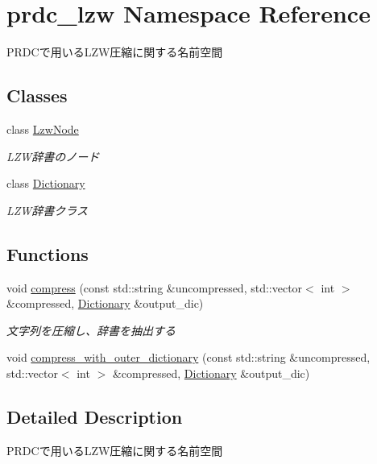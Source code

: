 \hypertarget{namespaceprdc__lzw}{\section{prdc\-\_\-lzw Namespace Reference}
\label{namespaceprdc__lzw}
}


P\-R\-D\-Cで用いる\-L\-Z\-W圧縮に関する名前空間  


\subsection*{Classes}
\begin{DoxyCompactItemize}
\item 
class \hyperlink{classprdc__lzw_1_1LzwNode}{Lzw\-Node}
\begin{DoxyCompactList}\small\item\em L\-Z\-W辞書のノード \end{DoxyCompactList}\item 
class \hyperlink{classprdc__lzw_1_1Dictionary}{Dictionary}
\begin{DoxyCompactList}\small\item\em L\-Z\-W辞書クラス \end{DoxyCompactList}\end{DoxyCompactItemize}
\subsection*{Functions}
\begin{DoxyCompactItemize}
\item 
void \hyperlink{namespaceprdc__lzw_a09931e4cc68e675f2058ee251b1e761f}{compress} (const std\-::string \&uncompressed, std\-::vector$<$ int $>$ \&compressed, \hyperlink{classprdc__lzw_1_1Dictionary}{Dictionary} \&output\-\_\-dic)
\begin{DoxyCompactList}\small\item\em 文字列を圧縮し、辞書を抽出する \end{DoxyCompactList}\item 
void \hyperlink{namespaceprdc__lzw_a81663f550046c9a805ca2e4d60df03dc}{compress\-\_\-with\-\_\-outer\-\_\-dictionary} (const std\-::string \&uncompressed, std\-::vector$<$ int $>$ \&compressed, \hyperlink{classprdc__lzw_1_1Dictionary}{Dictionary} \&output\-\_\-dic)
\end{DoxyCompactItemize}


\subsection{Detailed Description}
P\-R\-D\-Cで用いる\-L\-Z\-W圧縮に関する名前空間 

